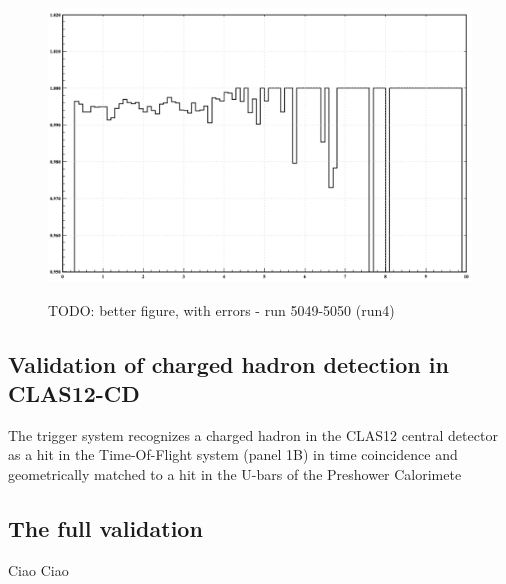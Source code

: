 \begin{figure}[!htb]
 \centering
{\includegraphics[width=.5\textwidth]{img/FD_TrackEfficiency.png}}
 \caption{TODO: better figure, with errors - run 5049-5050 (run4)}
 \label{fig:FD_TrackEfficiency}
\end{figure}



\subsection{Validation of charged hadron detection in CLAS12-CD}

The trigger system recognizes a charged hadron in the CLAS12 central detector as a hit in the Time-Of-Flight system (panel 1B) in time coincidence and geometrically matched to a hit in the U-bars of the Preshower Calorimete

\subsection{The full validation}

Ciao Ciao